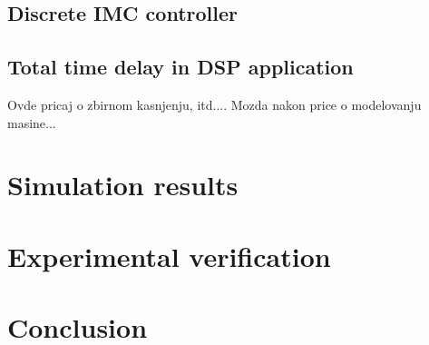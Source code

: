 \documentclass[journal]{IEEEtran}
\begin{document}
\subsection{Discrete IMC controller}

\subsection{Total time delay in DSP application}
Ovde pricaj o zbirnom kasnjenju, itd....
Mozda nakon price o modelovanju masine...



\section{Simulation results}

\section{Experimental verification}

\section{Conclusion}


\ifCLASSOPTIONcaptionsoff
  \newpage
\fi



\end{document}
